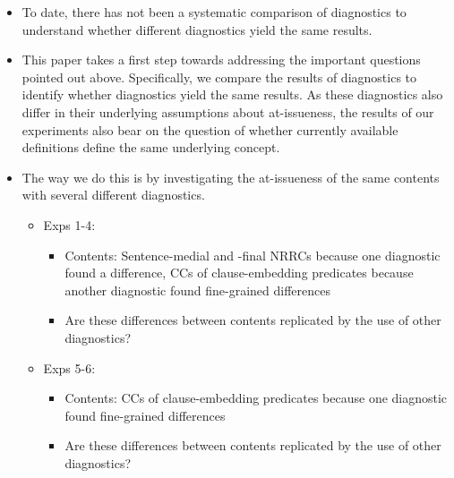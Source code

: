 \documentclass[times,linguex,xcolor]{glossa}
\begin{document}
\begin{itemize}[leftmargin=12pt]



\item To date, there has not been a systematic comparison of diagnostics to understand whether different diagnostics yield the same results.

\item This paper takes a first step towards addressing the important questions pointed out above. Specifically, we compare the results of diagnostics to identify whether diagnostics yield the same results. As these diagnostics also differ in their underlying assumptions about at-issueness, the results of our experiments also bear on the question of whether currently available definitions define the same underlying concept.

\item The way we do this is by investigating the at-issueness of the same contents with several different diagnostics. 

\begin{itemize}

\item Exps 1-4:  

\begin{itemize}

\item Contents: Sentence-medial and -final NRRCs because one diagnostic found a difference, CCs of clause-embedding predicates because another diagnostic found fine-grained differences

\item Are these differences between contents replicated by the use of other diagnostics?

\end{itemize}

\item Exps 5-6:

\begin{itemize}

\item Contents: CCs of clause-embedding predicates because one diagnostic found fine-grained differences

\item Are these differences between contents replicated by the use of other diagnostics?

\end{itemize}

\end{itemize}


\end{itemize}
\end{document}
